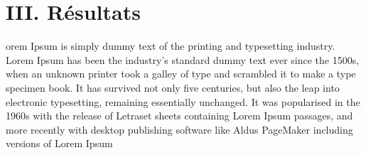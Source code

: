 \documentclass[11pt]{article}
\begin{document}
\newpage
\section*{III. Résultats}
\label{resultats}

orem Ipsum is simply dummy text of the printing and typesetting industry. Lorem Ipsum has been the industry's standard dummy text ever since the 1500s, when an unknown printer took a galley of type and scrambled it to make a type specimen book. It has survived not only five centuries, but also the leap into electronic typesetting, remaining essentially unchanged. It was popularised in the 1960s with the release of Letraset sheets containing Lorem Ipsum passages, and more recently with desktop publishing software like Aldus PageMaker including versions of Lorem Ipsum
\end{document}
